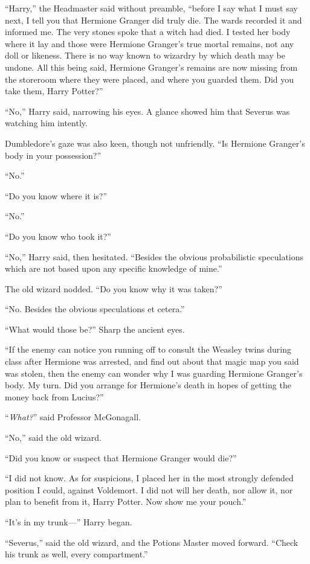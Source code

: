 “Harry,” the Headmaster said without preamble, “before I say what I must say next, I tell you that Hermione Granger did truly die. The wards recorded it and informed me. The very stones spoke that a witch had died. I tested her body where it lay and those were Hermione Granger’s true mortal remains, not any doll or likeness. There is no way known to wizardry by which death may be undone. All this being said, Hermione Granger’s remains are now missing from the storeroom where they were placed, and where you guarded them. Did you take them, Harry Potter?”

“No,” Harry said, narrowing his eyes. A glance showed him that Severus was watching him intently.

Dumbledore’s gaze was also keen, though not unfriendly. “Is Hermione Granger’s body in your possession?”

“No.”

“Do you know where it is?”

“No.”

“Do you know who took it?”

“No,” Harry said, then hesitated. “Besides the obvious probabilistic speculations which are not based upon any specific knowledge of mine.”

The old wizard nodded. “Do you know why it was taken?”

“No. Besides the obvious speculations et cetera.”

“What would those be?” Sharp the ancient eyes.

“If the enemy can notice you running off to consult the Weasley twins during class after Hermione was arrested, and find out about that magic map you said was stolen, then the enemy can wonder why I was guarding Hermione Granger’s body. My turn. Did you arrange for Hermione’s death in hopes of getting the money back from Lucius?”

“\emph{What?}” said Professor McGonagall.

“No,” said the old wizard.

“Did you know or suspect that Hermione Granger would die?”

“I did not know. As for suspicions, I placed her in the most strongly defended position I could, against Voldemort. I did not will her death, nor allow it, nor plan to benefit from it, Harry Potter. Now show me your pouch.”

“It’s in my trunk—” Harry began.

“Severus,” said the old wizard, and the Potions Master moved forward. “Check his trunk as well, every compartment.”

